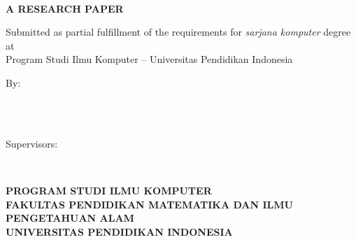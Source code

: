 \thispagestyle{empty}
\begin{center}
\begin{doublespace}
\textbf{\smaller\large{\MakeUppercase{\judul}}}\\[2.5cm]
\end{doublespace}

\textbf{\MakeUppercase{\large A Research Paper}}\\[0.5cm]
\begin{onehalfspace}
Submitted as partial fulfillment of the requirements for \textit{sarjana komputer} degree at\\
Program Studi Ilmu Komputer -- Universitas Pendidikan Indonesia\\[1.8cm]
\end{onehalfspace}

\large By: \\
\begin{onehalfspace}
\large{\penulis} \\
\large{\nim}\\[1.5cm]
\end{onehalfspace}
\vspace{1.5cm}

\large Supervisors: \\
\begin{onehalfspace}
\large{\pembimbingsatu} \\
\large{\pembimbingdua}
\end{onehalfspace}

\vfill

\textbf{\MakeUppercase{program studi ilmu komputer}}\\
\textbf{ \MakeUppercase{fakultas pendidikan matematika dan ilmu pengetahuan alam}}\\
\textbf{\MakeUppercase{UNIVERSITAS PENDIDIKAN INDONESIA}}\\
\textbf{\the\year{}}\\
\end{center}

